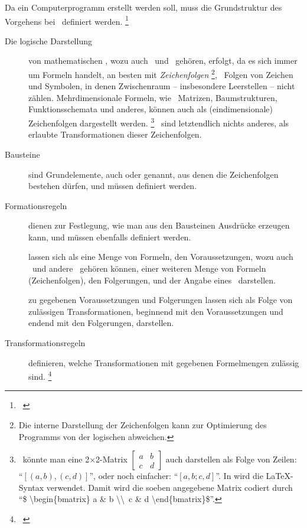 Da ein Computerprogramm erstellt werden soll, muss die Grundstruktur des Vorgehens bei \Beweisen\ definiert werden.%
\footnote{\seename~\cite{bib:Kalkuel}}

\begin{description}
	\item[Die logische Darstellung] von mathematischen \Aussagen, wozu auch \Axiome\ und \Saetze\ gehören, erfolgt, da es sich immer um Formeln handelt, an besten mit \emph{Zeichenfolgen}%
	\footnote{%
		Die interne Darstellung der Zeichenfolgen kann zur Optimierung des Programms von der logischen abweichen.
	},
	\textdh\ Folgen von Zeichen und Symbolen, in denen Zwischenraum -- insbesondere Leerstellen -- nicht zählen.
	Mehrdimensionale Formeln, wie \textzB\ Matrizen, Baumstrukturen, Funktionsschemata und anderes, können auch als (eindimensionale) Zeichenfolgen dargestellt werden.%
	\footnote{%
		\textZB\ könnte man eine 2$\times$2-Matrix
		$\begin{bmatrix} a & b \\ c & d \end{bmatrix}$
		auch darstellen als Folge von Zeilen: \enquote{$[(a,b),(c,d)]$}, oder noch einfacher: \enquote{$[a,b;c,d]$}.
		In \ASBA wird die \LaTeX-Syntax verwendet.
		Damit wird die soeben angegebene Matrix codiert durch \enquote{\$ \textbackslash begin\{bmatrix\} a \& b \textbackslash\textbackslash\ c \& d \textbackslash end\{bmatrix\}\$}.
	}
	\Beweise\ sind letztendlich nichts anderes, als erlaubte Transformationen dieser Zeichenfolgen.
	\item[Bausteine] sind Grundelemente, auch  oder  genannt, aus denen die Zeichenfolgen bestehen dürfen, und müssen definiert werden.
	\item[Formationsregeln] dienen zur Festlegung, wie man aus den Bausteinen Ausdrücke erzeugen kann, und müssen ebenfalls definiert werden.
	\item[\Saetze] lassen sich als eine Menge von Formeln, den Voraussetzungen, wozu auch \Axiome\ und andere \Saetze\ gehören können, einer weiteren Menge von Formeln (Zeichenfolgen), den Folgerungen, und der Angabe eines \Beweises\ darstellen.
	\item[\Beweise] zu gegebenen Voraussetzungen und Folgerungen lassen sich als Folge von zulässigen Transformationen, beginnend mit den Voraussetzungen und endend mit den Folgerungen, darstellen.
	\item[Transformationsregeln] definieren, welche Transformationen mit gegebenen Formelmengen zulässig sind.%
	\footnote{\seename~\cite{bib:Rautenberg,bib:Schlussregel,bib:NatuerlichesSchliessen}}
\end{description}

\Endchapter

